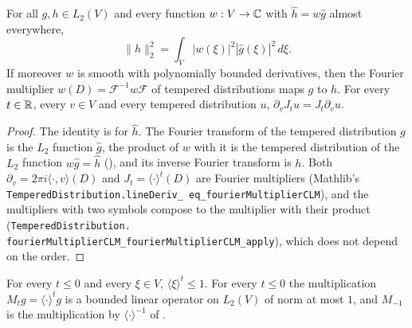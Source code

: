 \begin{lemma}
\label{lem:fourier-multipliers-l2}
\leanok
{}
For all $g, h \in L_2(V)$ and every function $w : V \to \mathbb{C}$ with $\widehat h = w \widehat g$
almost everywhere,
\[
  \|h\|_2^2 = \int_V |w(\xi)|^2 |\widehat g(\xi)|^2 \, d\xi .
\]
If moreover $w$ is smooth with polynomially bounded derivatives, then the Fourier multiplier
$w(D) = \mathcal F^{-1} w \mathcal F$ of tempered distributions maps $g$ to $h$. For every
$t \in \mathbb{R}$, every $v \in V$ and every tempered distribution $u$,
$\partial_v J_t u = J_t \partial_v u$.
\end{lemma}

\begin{proof}
\leanok
The identity is  for $\widehat h$. The Fourier transform of the
tempered distribution $g$ is the $L_2$ function $\widehat g$, the product of $w$ with it is the
tempered distribution of the $L_2$ function $w \widehat g = \widehat h$
(), and its inverse Fourier transform is $h$. Both
$\partial_v = 2 \pi i \langle \cdot, v \rangle(D)$ and $J_t = \langle \cdot \rangle^t(D)$ are
Fourier multipliers (Mathlib's \texttt{TemperedDistribution.\allowbreak lineDeriv\_\allowbreak
eq\_\allowbreak fourierMultiplierCLM}), and the multipliers with two symbols compose to the
multiplier with their product (\texttt{TemperedDistribution.\allowbreak
fourierMultiplierCLM\_\allowbreak fourierMultiplierCLM\_\allowbreak apply}), which does not
depend on the order.
\end{proof}

\begin{lemma}
\label{lem:bessel-weight-multiplier}
\leanok
{}
For every $t \leq 0$ and every $\xi \in V$, $\langle \xi \rangle^t \leq 1$. For every $t \leq 0$
the multiplication $M_t g = \langle \cdot \rangle^t g$ is a bounded linear operator on $L_2(V)$
of norm at most $1$, and $M_{-1}$ is the multiplication by $\langle \cdot \rangle^{-1}$ of
.
\end{lemma}

